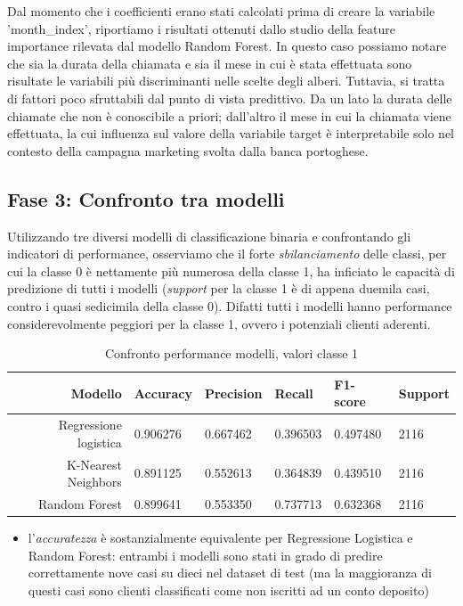 \documentclass[11,5pt, a4paper]{article}
\begin{document}
Dal momento che i coefficienti erano stati calcolati prima di creare la variabile 'month\_index', riportiamo i risultati ottenuti dallo studio della feature importance rilevata dal modello Random Forest. In questo caso possiamo notare che sia la durata della chiamata e sia il mese in cui è stata effettuata sono risultate le variabili più discriminanti nelle scelte degli alberi. 
Tuttavia, si tratta di fattori poco sfruttabili dal punto di vista predittivo. Da un lato la durata delle chiamate che non è conoscibile a priori; dall'altro il mese in cui la chiamata viene effettuata, la cui influenza sul valore della variabile target è interpretabile solo nel contesto della campagna marketing svolta dalla banca portoghese.

\subsection{Fase 3: Confronto tra modelli}
Utilizzando tre diversi modelli di classificazione binaria e confrontando gli indicatori di performance, osserviamo che il forte \textit{sbilanciamento} delle classi, per cui la classe 0 è nettamente più numerosa della classe 1, ha inficiato le capacità di predizione di tutti i modelli (\textit{support} per la classe 1 è di appena duemila casi, contro i quasi sedicimila della classe 0). Difatti tutti i modelli hanno performance considerevolmente peggiori per la classe 1, ovvero i potenziali clienti aderenti.


\begin{table}[H] 
    \centering
    \begin{tabular}{|r|l|l|l|l|l|}
    \hline
    Modello     & Accuracy & Precision & Recall & F1-score & Support\\
    \hline
    Regressione logistica     & 0.906276 & 0.667462 & 0.396503 & 0.497480 & 2116\\
    \hline
    K-Nearest Neighbors    & 0.891125 & 0.552613 & 0.364839 & 0.439510 & 2116\\
    \hline
    Random Forest     & 0.899641 & 0.553350 & 0.737713 & 0.632368 & 2116\\
    \hline
    \end{tabular}
    \caption{Confronto performance modelli, valori classe 1}
    \label{tab:models}
\end{table}

\begin{itemize}
    \item l’\textit{accuratezza} è sostanzialmente equivalente per Regressione Logistica e Random Forest: entrambi i modelli sono stati in grado di predire correttamente nove casi su dieci nel dataset di test (ma la maggioranza di questi casi sono clienti classificati come non iscritti ad un conto deposito)
\end{itemize}
\end{document}
